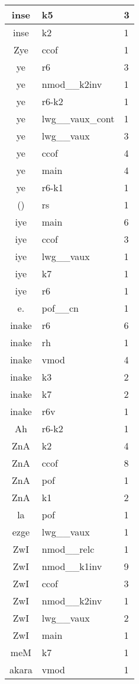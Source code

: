 \documentclass[a4 paper]{article}
\begin{document}
\begin{longtable}{cp{}p{}}
inse & k5 & 3\\ \midrule inse & k2 & 1\\ \midrule 
Zye & ccof & 1\\ \midrule 
ye & r6 & 3\\ \midrule ye & nmod\_\_k2inv & 1\\ \midrule ye & r6-k2 & 1\\ \midrule ye & lwg\_\_vaux\_cont & 1\\ \midrule ye & lwg\_\_vaux & 3\\ \midrule ye & ccof & 4\\ \midrule ye & main & 4\\ \midrule ye & r6-k1 & 1\\ \midrule 
() & rs & 1\\ \midrule 
iye & main & 6\\ \midrule iye & ccof & 3\\ \midrule iye & lwg\_\_vaux & 1\\ \midrule iye & k7 & 1\\ \midrule iye & r6 & 1\\ \midrule 
e. & pof\_\_cn & 1\\ \midrule 
inake & r6 & 6\\ \midrule inake & rh & 1\\ \midrule inake & vmod & 4\\ \midrule inake & k3 & 2\\ \midrule inake & k7 & 2\\ \midrule inake & r6v & 1\\ \midrule 
Ah & r6-k2 & 1\\ \midrule 
ZnA & k2 & 4\\ \midrule ZnA & ccof & 8\\ \midrule ZnA & pof & 1\\ \midrule ZnA & k1 & 2\\ \midrule 
la & pof & 1\\ \midrule 
ezge & lwg\_\_vaux & 1\\ \midrule 
ZwI & nmod\_\_relc & 1\\ \midrule ZwI & nmod\_\_k1inv & 9\\ \midrule ZwI & ccof & 3\\ \midrule ZwI & nmod\_\_k2inv & 1\\ \midrule ZwI & lwg\_\_vaux & 2\\ \midrule ZwI & main & 1\\ \midrule 
meM & k7 & 1\\ \midrule 
akara & vmod & 1\\ \midrule 

\end{longtable}
\end{document}
